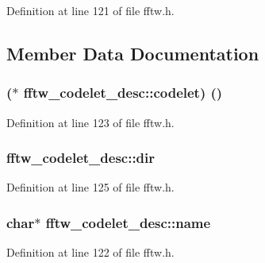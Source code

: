 Definition at line 121 of file fftw.\+h.



\subsection{Member Data Documentation}
\subsubsection[{\texorpdfstring{codelet}{codelet}}]{($\ast$ fftw\+\_\+codelet\+\_\+desc\+::codelet) ()}\hypertarget{structfftw__codelet__desc_a1f2dadf462a51aad48c0489c066ff1f8}{}\label{structfftw__codelet__desc_a1f2dadf462a51aad48c0489c066ff1f8}


Definition at line 123 of file fftw.\+h.

\subsubsection[{\texorpdfstring{dir}{dir}}]{ fftw\+\_\+codelet\+\_\+desc\+::dir}\hypertarget{structfftw__codelet__desc_aec7e3024bee1423a31c5a3e628154d1c}{}\label{structfftw__codelet__desc_aec7e3024bee1423a31c5a3e628154d1c}


Definition at line 125 of file fftw.\+h.

\subsubsection[{\texorpdfstring{name}{name}}]{ char$\ast$ fftw\+\_\+codelet\+\_\+desc\+::name}\hypertarget{structfftw__codelet__desc_a2e0f3f98d154f213a77939edc509a42d}{}\label{structfftw__codelet__desc_a2e0f3f98d154f213a77939edc509a42d}


Definition at line 122 of file fftw.\+h.

